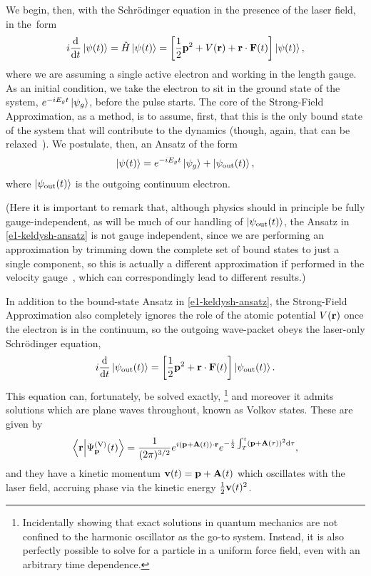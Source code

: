 We begin, then, with the Schrödinger equation in the presence of the laser field, in the~form
\begin{equation}
i\frac{\mathrm{d}}{\mathrm{d} t}\ket{\psi(t)}
=\hat H \ket{\psi(t)}
=\left[ \frac12 \vb{p}^2 + V(\vb{r}) + \vb{r}\cdot \vb{F}(t) \right]\ket{\psi(t)},
\label{e1-sfa-tdse}
\end{equation}
where we are assuming a single active electron and working in the length gauge. As an initial condition, we take the electron to sit in the ground state of the system, $e^{-iE_gt}\ket{\psi_g}$, before the pulse starts. The core of the Strong-Field Approximation, as a method, is to assume, first, that this is the only bound state of the system that will contribute to the dynamics (though, again, that can be relaxed~\cite{perez-hernandez_sfa-plus_2009}). We postulate, then, an Ansatz of the form
\begin{equation}
\ket{\psi(t)} = e^{-iE_g t}\ket{\psi_g} + \ket{\psi_\mathrm{out}(t)},
\label{e1-keldysh-ansatz}
\end{equation}
where $\ket{\psi_\mathrm{out}(t)}$ is the outgoing continuum electron.

(Here it is important to remark that, although physics should in principle be fully gauge-indepen\-dent, as will be much of our handling of $\ket{\psi_\mathrm{out}(t)}$, the Ansatz in \eqref{e1-keldysh-ansatz} is not gauge independent, since we are performing an approximation by trimming down the complete set of bound states to just a single component, so this is actually a different approximation if performed in the velocity gauge~\cite{galstyan_sfa-reformulation_2016}, which can correspondingly lead to different results.)

In addition to the bound-state Ansatz in \eqref{e1-keldysh-ansatz}, the Strong-Field Approximation also completely ignores the role of the atomic potential $V(\vb{r})$ once the electron is in the continuum, so the outgoing wave-packet obeys the laser-only Schrödinger equation,
\begin{equation}
i\frac{\mathrm{d}}{\mathrm{d} t}\ket{\psi_\mathrm{out}(t)}
=\left[ \frac12 \vb{p}^2 + \vb{r}\cdot \vb{F}(t) \right]\ket{\psi_\mathrm{out}(t)}.
\end{equation}
This equation can, fortunately, be solved exactly,%
%
\footnote{
Incidentally showing that exact solutions in quantum mechanics are not confined to the harmonic oscillator as the go-to system. Instead, it is also perfectly possible to solve for a particle in a uniform force field, even with an arbitrary time dependence.
}
%
and moreover it admits solutions which are plane waves throughout, known as Volkov states. These are given by
\begin{equation}
\braket{\vb{r}}{\Psi^\mathrm{(V)}_{\vb{p}}(t)}
=
\frac{1}{(2\pi)^{3/2}}
e^{i(\vb{p}+\vb{A}(t))\cdot\vb{r}}
e^{-\frac i2 \int_{T}^t \left(\vb{p}+\vb{A}(\tau)\right)^2 \mathrm{d}\tau}
,
\label{e1-volkov-wavefunctions}
\end{equation}
and they have a kinetic momentum $\vb{v}(t)=\vb{p}+\vb{A}(t)$ which oscillates with the laser field, accruing phase via the kinetic energy $\frac12 \vb{v}(t)^2$. 

